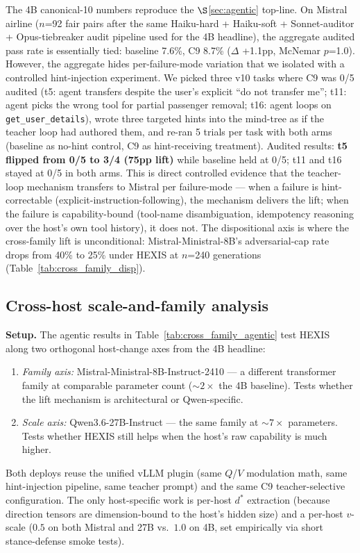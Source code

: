 The 4B canonical-10 numbers reproduce the $\S$\ref{sec:agentic} top-line. On Mistral airline ($n$=92 fair pairs after the same Haiku-hard + Haiku-soft + Sonnet-auditor + Opus-tiebreaker audit pipeline used for the 4B headline), the aggregate audited pass rate is essentially tied: baseline 7.6\%, C9 8.7\% ($\Delta$ +1.1pp, McNemar $p$=1.0). However, the aggregate hides per-failure-mode variation that we isolated with a controlled hint-injection experiment. We picked three v10 tasks where C9 was 0/5 audited (t5: agent transfers despite the user's explicit ``do not transfer me''; t11: agent picks the wrong tool for partial passenger removal; t16: agent loops on \texttt{get\_user\_details}), wrote three targeted hints into the mind-tree as if the teacher loop had authored them, and re-ran 5 trials per task with both arms (baseline as no-hint control, C9 as hint-receiving treatment). Audited results: \textbf{t5 flipped from 0/5 to 3/4 (75pp lift)} while baseline held at 0/5; t11 and t16 stayed at 0/5 in both arms. This is direct controlled evidence that the teacher-loop mechanism transfers to Mistral per failure-mode --- when a failure is hint-correctable (explicit-instruction-following), the mechanism delivers the lift; when the failure is capability-bound (tool-name disambiguation, idempotency reasoning over the host's own tool history), it does not. The dispositional axis is where the cross-family lift is unconditional: Mistral-Ministral-8B's adversarial-cap rate drops from 40\% to 25\% under HEXIS at $n$=240 generations (Table~\ref{tab:cross_family_disp}).

\subsection{Cross-host scale-and-family analysis}
\label{sec:scale_analysis}

\textbf{Setup.} The agentic results in Table~\ref{tab:cross_family_agentic} test HEXIS along two orthogonal host-change axes from the 4B headline:
\begin{enumerate}
\item \emph{Family axis:} Mistral-Ministral-8B-Instruct-2410 --- a different transformer family at comparable parameter count ($\sim$$2\times$ the 4B baseline). Tests whether the lift mechanism is architectural or Qwen-specific.
\item \emph{Scale axis:} Qwen3.6-27B-Instruct --- the same family at $\sim$$7\times$ parameters. Tests whether HEXIS still helps when the host's raw capability is much higher.
\end{enumerate}
Both deploys reuse the unified vLLM plugin (same $Q$/$V$ modulation math, same hint-injection pipeline, same teacher prompt) and the same C9 teacher-selective configuration. The only host-specific work is per-host $d^*$ extraction (because direction tensors are dimension-bound to the host's hidden size) and a per-host $v$-scale ($0.5$ on both Mistral and 27B vs.\ $1.0$ on 4B, set empirically via short stance-defense smoke tests).

